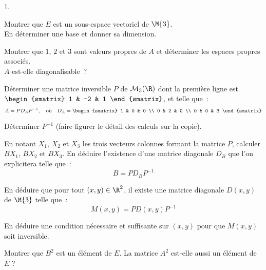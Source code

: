\begin{noliste}{1.}
 \setlength{\itemsep}{4mm}
 \item Montrer que $E$ est un sous-espace vectoriel de 
 $\M{3}$.\\ 
 En déterminer une base et donner sa 
 dimension.
 
 


 \item Montrer que $1$, $2$ et $3$ sont valeurs propres de $A$ et 
 déterminer les espaces propres associés.\\ 
 $A$ est-elle diagonalisable~?
 
 
 
\item Déterminer une matrice inversible $P$ de $\mathcal{M}_3(\R)$
  dont la première ligne est $\begin{smatrix} 1 & -2 & 1
  \end{smatrix}$, et telle que~:
  \[ 
  A = P D_A P^{-1}, \quad \text{où} \quad D_A = 
  \begin{smatrix} 
    1 & 0 & 0 \\ 
    0 & 2 & 0 \\ 
    0 & 0 & 3 
  \end{smatrix} 
  \]
  
  




 \item Déterminer $P^{-1}$ (faire figurer le détail des calculs sur la 
 copie).
 
 
 
\item En notant $X_1$, $X_2$ et $X_3$ les trois vecteurs colonnes
  formant la matrice $P$, calculer $BX_1$, $BX_2$ et $BX_3$.  En
  déduire l'existence d'une matrice diagonale $D_B$ que l'on
  explicitera telle que~:
  \[ 
  B = PD_BP^{-1} 
  \]
  
  

 
 \item En déduire que pour tout $(x,y) \in \R^2$, il existe une 
 matrice diagonale $D(x,y)$ de $\M{3}$ telle que~:
 \[ 
 M(x,y) = P D(x,y) P^{-1} 
 \]
 
 
 
 

 
 \item En déduire une condition nécessaire et suffisante sur $(x,y)$ 
 pour que $M(x,y)$ soit inversible.

 
 
\item Montrer que $B^2$ est un élément de $E$. La matrice $A^2$
  est-elle aussi un élément de $E$ ?
 
 
 \end{noliste}

